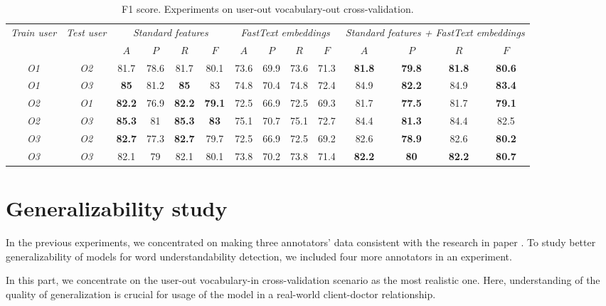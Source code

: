 \begin{table}[h]
\begin{tabular}{cc|cccc|cccc|cccc}
\multirow{2}{0.6cm}{\textit{Train user}} & \multirow{2}{0.6cm}{\textit{Test user}} & \multicolumn{4}{c|}{\textit{Standard features}} & \multicolumn{4}{c|}{\textit{FastText embeddings}} & \multicolumn{4}{X}{\textit{Standard features + FastText embeddings}} \\ \cline{3-14} 
 &  & $A$ & $P$ & $R$ & $F$ & $A$ & $P$ & $R$ & $F$ & $A$ & $P$ & $R$ & $F$ \\ \hline
\textit{O1} & \textit{O2} & 81.7 & 78.6 & 81.7 & 80.1 & 73.6 & 69.9 & 73.6 & 71.3 & \textbf{81.8} & \textbf{79.8} & \textbf{81.8} & \textbf{80.6} \\ 
\textit{O1} & \textit{O3} & \textbf{85} & 81.2 & \textbf{85} & 83 & 74.8 & 70.4 & 74.8 & 72.4 & 84.9 & \textbf{82.2} & 84.9 & \textbf{83.4} \\ \hline 
\textit{O2} & \textit{O1} & \textbf{82.2} & 76.9 & \textbf{82.2} & \textbf{79.1} & 72.5 & 66.9 & 72.5 & 69.3 & 81.7 & \textbf{77.5} & 81.7 & \textbf{79.1} \\
\textit{O2} & \textit{O3} & \textbf{85.3} & 81 & \textbf{85.3} & \textbf{83} & 75.1 & 70.7 & 75.1 & 72.7 & 84.4 & \textbf{81.3} & 84.4 & 82.5 \\ \hline 
\textit{O3} & \textit{O2} & \textbf{82.7} & 77.3 & \textbf{82.7} & 79.7 & 72.5 & 66.9 & 72.5 & 69.2 & 82.6 & \textbf{78.9} & 82.6 & \textbf{80.2} \\ 
\textit{O3} & \textit{O3} & 82.1 & 79 & 82.1 & 80.1 & 73.8 & 70.2 & 73.8 & 71.4 & \textbf{82.2} & \textbf{80} & \textbf{82.2} & \textbf{80.7} \\ \hline 
\end{tabular}
    \caption{F1 score. Experiments on user-out vocabulary-out cross-validation.}
    \label{tab:user-out-voc-out}
\end{table}

\section{Generalizability study}
\label{sec:generalizability-study}
In the previous experiments, we concentrated on making three annotators' data consistent with the research in paper \cite{Grabar-PITR2014}. To study better generalizability of models for word understandability detection, we included four more annotators in an experiment.

In this part, we concentrate on the user-out vocabulary-in cross-validation scenario as the most realistic one. Here, understanding of the quality of generalization is crucial for usage of the model in a real-world client-doctor relationship.

